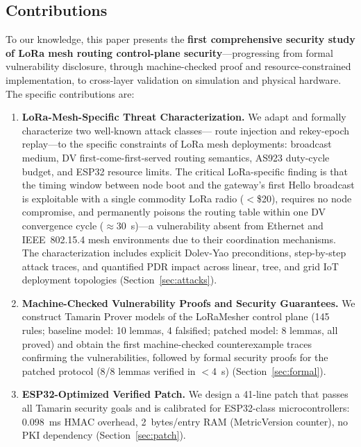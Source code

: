 \documentclass[10pt,journal,compsoc]{IEEEtran}
\begin{document}
\subsection{Contributions}

To our knowledge, this paper presents the \textbf{first
comprehensive security study of LoRa mesh routing control-plane
security}—progressing from formal vulnerability disclosure, through
machine-checked proof and resource-constrained implementation, to
cross-layer validation on simulation and physical hardware.
The specific contributions are:

\begin{enumerate}
  \item \textbf{LoRa-Mesh-Specific Threat Characterization.}
    We adapt and formally characterize two well-known attack classes—
    route injection and rekey-epoch replay—to the specific constraints
    of LoRa mesh deployments: broadcast medium, DV first-come-first-served
    routing semantics, AS923 duty-cycle budget, and ESP32 resource limits.
    The critical LoRa-specific finding is that the timing window between
    node boot and the gateway's first Hello broadcast is exploitable with
    a single commodity LoRa radio ($<$\$20), requires no node compromise,
    and permanently poisons the routing table within one DV convergence
    cycle ($\approx$30~s)—a vulnerability absent from Ethernet and
    IEEE~802.15.4 mesh environments due to their coordination mechanisms.
    The characterization includes explicit Dolev-Yao preconditions,
    step-by-step attack traces, and quantified PDR impact across
    linear, tree, and grid IoT deployment topologies
    (Section~\ref{sec:attacks}).

  \item \textbf{Machine-Checked Vulnerability Proofs and Security
    Guarantees.} We construct Tamarin Prover models of the
    LoRaMesher control plane (145 rules; baseline model: 10 lemmas,
    4 falsified; patched model: 8 lemmas, all proved) and obtain
    the first machine-checked counterexample traces confirming the
    vulnerabilities, followed by formal security proofs for the
    patched protocol (8/8 lemmas verified in $<$4~s)
    (Section~\ref{sec:formal}).

  \item \textbf{ESP32-Optimized Verified Patch.} We design a
    41-line patch that passes all Tamarin security goals and is
    calibrated for ESP32-class microcontrollers: 0.098~ms HMAC
    overhead, 2~bytes/entry RAM (MetricVersion counter), no PKI dependency
    (Section~\ref{sec:patch}).


\end{enumerate}
\end{document}
